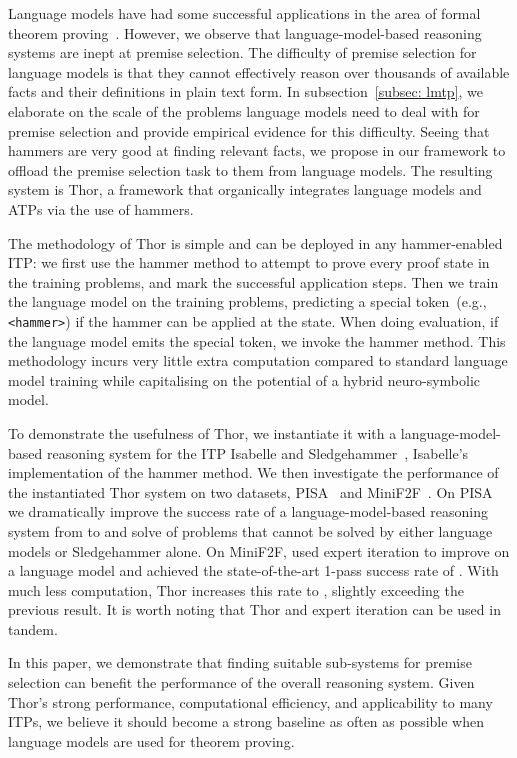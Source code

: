 \documentclass{article}
\begin{document}
Language models have had some successful applications in the area of formal theorem proving~\citep{polu2020generative, han2021proof, jiang2021lisa, polu2022formal}.
However, we observe that language-model-based reasoning systems are inept at premise selection.
The difficulty of premise selection for language models is that they cannot effectively reason over thousands of available facts and their definitions in plain text form. In subsection~\ref{subsec: lmtp}, we elaborate on the scale of the problems language models need to deal with for premise selection and provide empirical evidence for this difficulty.
Seeing that hammers are very good at finding relevant facts, we propose in our framework to offload the premise selection task to them from language models.
The resulting system is Thor, a framework that organically integrates language models and ATPs via the use of hammers.

The methodology of Thor is simple and can be deployed in any hammer-enabled ITP:
we first use the hammer method to attempt to prove every proof state in the training problems, and mark the successful application steps.
Then we train the language model on the training problems, predicting a special token~(e.g., \texttt{<hammer>}) if the hammer can be applied at the state.
When doing evaluation, if the language model emits the special token, we invoke the hammer method. 
This methodology incurs very little extra computation compared to standard language model training while capitalising on the potential of a hybrid neuro-symbolic model.


To demonstrate the usefulness of Thor, we instantiate it with a language-model-based reasoning system for the ITP Isabelle and Sledgehammer~\citep{paulson2010three}, Isabelle's implementation of the hammer method.
We then investigate the performance of the instantiated Thor system on two datasets, PISA~\citep{jiang2021lisa} and MiniF2F~\citep{zheng2022minif2f}. On PISA we dramatically improve the success rate of a language-model-based reasoning system from  to  and solve  of problems that cannot be solved by either language models or Sledgehammer alone. On MiniF2F, \citet{polu2022formal} used expert iteration to improve on a language model and achieved the state-of-the-art 1-pass success rate of . With much less computation, Thor increases this rate to , slightly exceeding the previous result. It is worth noting that Thor and expert iteration can be used in tandem.


In this paper, we demonstrate that finding suitable sub-systems for premise selection can benefit the performance of the overall reasoning system. 
Given Thor's strong performance, computational efficiency, and applicability to many ITPs,
we believe it should become a strong baseline as often as possible when language models are used for theorem proving. 
\end{document}
